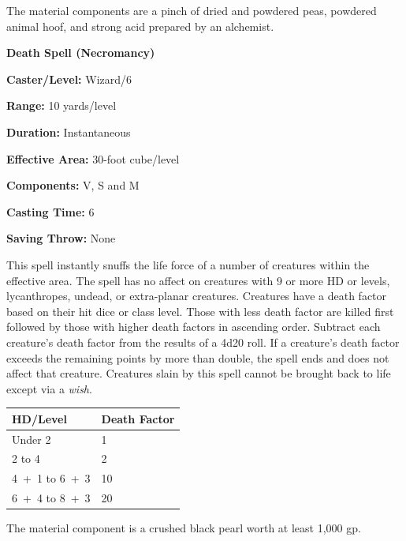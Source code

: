 \begin{multicols}{2}
The material components are a pinch of dried and powdered peas, powdered animal hoof, and strong acid prepared by an alchemist.

\vspace{1em}

\noindent
\begin{minipage}{\columnwidth}

\noindent \textbf{Death Spell (Necromancy)}

\noindent \textbf{Caster/Level:} Wizard/6

\noindent \textbf{Range:} 10 yards/level

\noindent \textbf{Duration:} Instantaneous 

\noindent \textbf{Effective Area:} 30-foot cube/level

\noindent \textbf{Components:} V, S and M

\noindent \textbf{Casting Time:} 6

\noindent \textbf{Saving Throw:} None

\end{minipage}

This spell instantly snuffs the life force of a number of creatures within the effective area.  The spell has no affect on creatures with 9 or more HD or levels, lycanthropes, undead, or extra-planar creatures.  Creatures have a death factor based on their hit dice or class level.  Those with less death factor are killed first followed by those with higher death factors in ascending order.  Subtract each creature's death factor from the results of a 4d20 roll.  If a creature's death factor exceeds the remaining points by more than double, the spell ends and does not affect that creature.  Creatures slain by this spell cannot be brought back to life except via a \textit{wish}.

\noindent
\begin{tabular}{|p{}|p{}|}
\hline
HD/Level	& Death Factor \\
\hline\hline
\rowcolor[gray]{.9}Under 2	& 1 \\
2 to 4	& 2 \\
\rowcolor[gray]{.9}4~+~1 to 6~+~3	& 10 \\
6~+~4 to 8~+~3	& 20 \\
\hline
\end{tabular}

The material component is a crushed black pearl worth at least 1,000 gp.

\vspace{1em}


\end{multicols}
